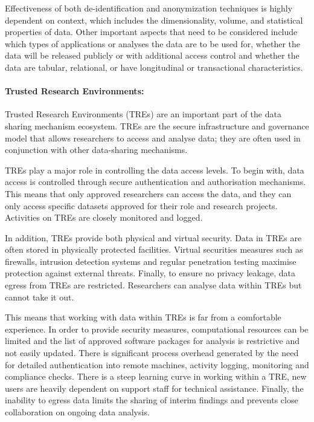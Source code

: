 \documentclass[11pt]{article}
\begin{document}
Effectiveness of both de-identification and anonymization techniques is highly dependent on context, which includes the dimensionality, volume, and statistical properties of data. Other important aspects that need to be considered include which types of applications or analyses the data are to be used for, whether the data will be released publicly or with additional access control and whether the data are tabular, relational, or have longitudinal or transactional characteristics.

\paragraph{Trusted Research Environments:}

Trusted Research Environments (TREs) are an important part of the data sharing mechanism ecosystem. TREs are the secure infrastructure and governance model that allows researchers to access and analyse data; they are often used in conjunction with other data-sharing mechanisms.

TREs play a major role in controlling the data access levels. To begin with, data access is controlled through secure authentication and authorisation mechanisms. This means that only approved researchers can access the data, and they can only access specific datasets approved for their role and research projects. Activities on TREs are closely monitored and logged.

In addition, TREs provide both physical and virtual security. Data in TREs are often stored in physically protected facilities. Virtual securities  measures such as firewalls, intrusion detection systems and regular penetration testing maximise protection against external threats.  Finally, to ensure no privacy leakage, data egress from TREs are restricted. Researchers can analyse data within TREs but cannot take it out.

This means that working with data within TREs is far from a comfortable experience. In order to provide security measures, computational resources can be limited and the list of approved software packages for analysis is restrictive and not easily updated. There is significant process overhead generated by the need for detailed authentication into remote machines, activity logging, monitoring and compliance checks. There is a steep learning curve in working within a TRE, new users are heavily dependent on support staff for technical assistance. Finally, the inability to egress data limits the sharing of interim findings and prevents close collaboration on ongoing data analysis.
\end{document}

